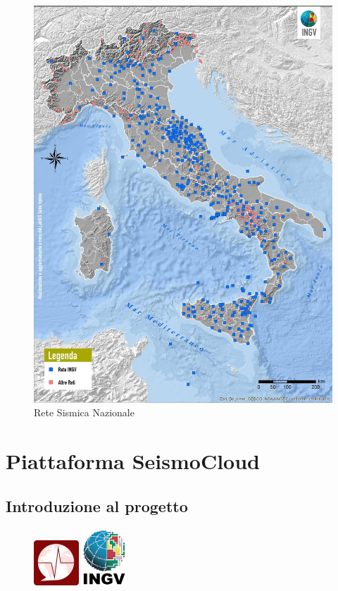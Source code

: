\documentclass[a4paper,10pt]{memoir}
\begin{document}
\begin{figure}
\caption{Rete Sismica Nazionale \cite{ingv}}
\label{fig:RSN}
\includegraphics[width=1\textwidth]{Chapter-1/RSN.jpg}
\end{figure}

\clearpage

\section{Piattaforma SeismoCloud}

\subsection{Introduzione al progetto}

\begin{figure}
\includegraphics[width=0.15\textwidth]{Chapter-1/seismocloud.png}
\includegraphics[width=0.15\textwidth]{Chapter-1/ingv.jpg}
\end{figure}
\end{document}
